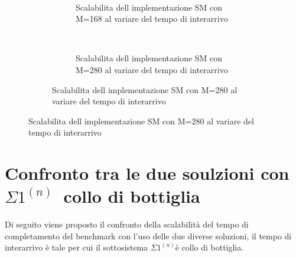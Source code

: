 \documentclass[a4paper]{article}
\newcommand{\subsystem}{$\Sigma1^{(n)}$}
\begin{document}
\begin{figure}[!h]
\begin{subfigure}[b]{.5\columnwidth}
    ~
    \begin{subfigure}[b]{\textwidth}
      \centering
      \addtocounter{subfigure}{-1}
      \renewcommand\thesubfigure{\alph{subfigure}2}
      \resizebox{\columnwidth}{!}{}
      \caption{Scalabilita dell implementazione SM con M=168 al variare del tempo di interarrivo}
      \label{fig:scalability_SM_size168}
    \end{subfigure}
    ~
    \begin{subfigure}[b]{\textwidth}
      \centering
      \addtocounter{subfigure}{-1}
      \renewcommand\thesubfigure{\alph{subfigure}3}
      \resizebox{\columnwidth}{!}{}
      \caption{Scalabilita dell implementazione SM con M=280 al variare del tempo di interarrivo}
      \label{fig:scalability_SM_size280}
    \end{subfigure}
    \label{fig:allscalability_SM}
  \end{subfigure}
\end{figure}

\FloatBarrier 
\newpage
\section{Confronto tra le due soulzioni con \subsystem\ collo di bottiglia}
Di seguito viene proposto il confronto della scalabilit\`a del tempo di completamento del benchmark con l'uso delle due diverse soluzioni, il tempo di interarrivo \`e tale per cui il sottosistema \subsystem \`e collo di bottiglia.




\end{document}
